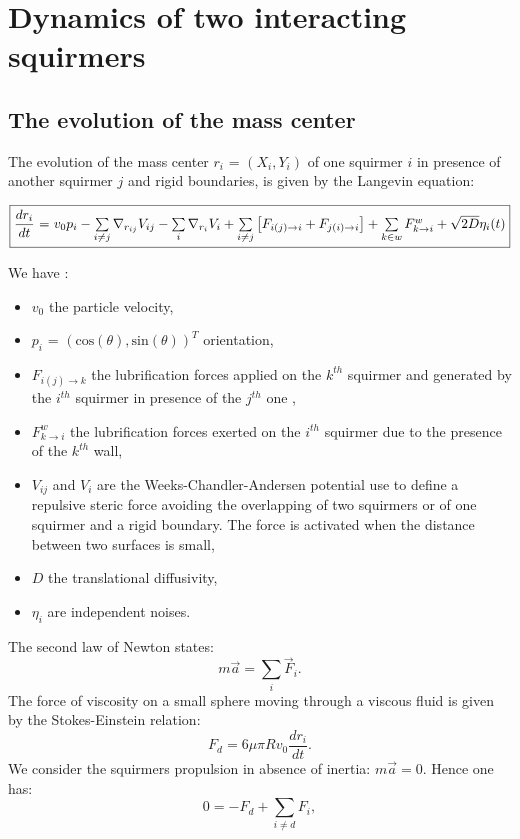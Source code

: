 \documentclass{article}
\begin{document}
\section{Dynamics of two interacting squirmers}
\subsection{The evolution of the mass center}
The evolution of the mass center $r_i$ = $(X_i, Y_i)$ of one squirmer $i$ in presence of 
another squirmer $j$ and rigid boundaries, is given by the Langevin equation:
\begin{center}
$\boxed{\frac{dr_i}{dt}$ = $v_0 p_i -  \sum\limits_{i \ne j}\nabla_{r_{ij}} V_{ij} - \sum\limits_{i}\nabla_{r_i} V_i + \sum\limits_{i\ne j}\left[F_{i(j)\rightarrow i} + F_{j(i)\rightarrow i}\right]+ \sum\limits_{k \in w}F_{k\rightarrow i}^w + \sqrt{2D}\eta_i(t)}$
\end{center}
We have : \begin{itemize}
    \item $v_0$ the particle velocity,
    \item $p_i$ = $(\mathrm{cos}(\theta),\mathrm{sin}(\theta))^T$ orientation,
    \item $F_{i(j)\rightarrow k}$ the lubrification forces applied on the $k^{th}$ squirmer and generated by the $i^{th}$ squirmer in presence of the $j^{th}$ one \cite{Brumley},
    \item $F^w_{k\rightarrow i}$ the lubrification forces exerted on the $i^{th}$ squirmer due to the presence of the $k^{th}$ wall\cite{Brumley},
    \item $V_{ij}$ and $V_i$ are the Weeks-Chandler-Andersen potential use to define a repulsive steric force avoiding 
    the overlapping of two squirmers or of one squirmer and a rigid boundary. 
    The force is activated when the distance between two surfaces is small,
    \item $D$ the translational diffusivity,
    \item $\eta_i$ are independent noises. 
\end{itemize} 
\vspace{0,5cm}
The second law of Newton states\cite{Newton}:
$$m\vec{a} = \sum\limits_i \vec{F}_i.$$
The force of viscosity on a small sphere moving through a viscous fluid is given by the Stokes-Einstein relation\cite{Stokes}:
$$F_d = 6\mu\pi Rv_0\frac{dr_i}{dt}.$$
We consider the squirmers propulsion in absence of inertia: $m\vec{a} = 0$. Hence one has:
$$0 = -F_d + \sum\limits_{i \ne d} F_i,$$
\end{document}
